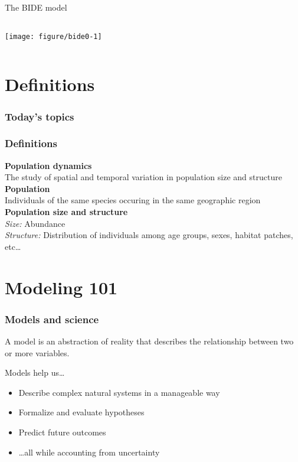 \documentclass[color=usenames,dvipsnames]{beamer}\usepackage[]{graphicx}\usepackage[]{color}
\begin{document}
\begin{frame}
  \centering
    \huge
    The BIDE model \\
    \vfill

\begin{columns}
  \column{\dimexpr\paperwidth-10pt}
  \centering
  \texttt{[image: figure/bide0-1]} \\
\end{columns}
\end{frame}



\section{Definitions}


\begin{frame}
  \frametitle{Today's topics}
  \LARGE
\end{frame}


\begin{frame}
  \frametitle{Definitions}
  {\bf Population dynamics \\}
    The study of spatial and temporal variation in population size and structure
  \pause
  \vfill
  {\bf Population \\}
    Individuals of the same species occuring in the same geographic region
  \pause
  \vfill
  {\bf Population size and structure \\}
    {\color{Red}
      \it Size:} Abundance \\
    {\color{Red}
      \it Structure:} Distribution of individuals among age groups, sexes,
    habitat patches, etc\dots
\end{frame}



\section{Modeling 101}





\begin{frame}
  \frametitle{Models and science}
  \large
  A model is an abstraction of reality that describes the relationship between two or more variables. \par
  \pause
  \vfill
  {%
    Models help us\dots}
  \begin{itemize}[<+->]
    \item Describe complex natural systems in a manageable way
    \item Formalize and evaluate hypotheses
    \item Predict future outcomes
    \item \dots all while accounting from uncertainty
  \end{itemize}
\end{frame}
\end{document}

